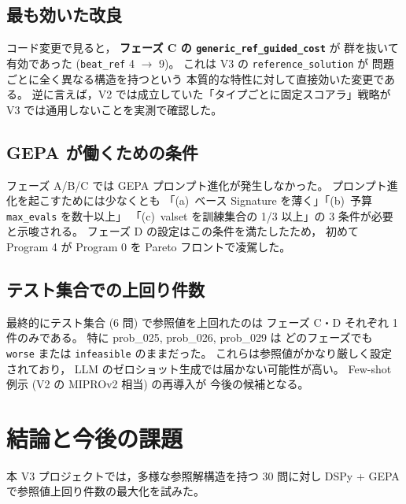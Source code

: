\documentclass[uplatex,dvipdfmx,a4paper,11pt]{jsarticle}
\begin{document}
\subsection{最も効いた改良}

コード変更で見ると，
\textbf{フェーズ C の \texttt{generic\_ref\_guided\_cost}} が
群を抜いて有効であった (\texttt{beat\_ref} 4 $\rightarrow$ 9)。
これは V3 の \texttt{reference\_solution} が
問題ごとに全く異なる構造を持つという
本質的な特性に対して直接効いた変更である。
逆に言えば，V2 では成立していた「タイプごとに固定スコアラ」戦略が
V3 では通用しないことを実測で確認した。

\subsection{GEPA が働くための条件}

フェーズ A/B/C では GEPA プロンプト進化が発生しなかった。
プロンプト進化を起こすためには少なくとも
「(a)~ベース Signature を薄く」「(b)~予算 \texttt{max\_evals} を数十以上」
「(c)~valset を訓練集合の 1/3 以上」の 3 条件が必要と示唆される。
フェーズ D の設定はこの条件を満たしたため，
初めて Program 4 が Program 0 を Pareto フロントで凌駕した。

\subsection{テスト集合での上回り件数}

最終的にテスト集合 (6 問) で参照値を上回れたのは
フェーズ C・D それぞれ 1 件のみである。
特に prob\_025, prob\_026, prob\_029 は
どのフェーズでも \texttt{worse} または \texttt{infeasible} のままだった。
これらは参照値がかなり厳しく設定されており，
LLM のゼロショット生成では届かない可能性が高い。
Few-shot 例示 (V2 の MIPROv2 相当) の再導入が
今後の候補となる。

\section{結論と今後の課題}\label{sec:conc}

本 V3 プロジェクトでは，多様な参照解構造を持つ 30 問に対し
DSPy + GEPA で参照値上回り件数の最大化を試みた。
\end{document}
